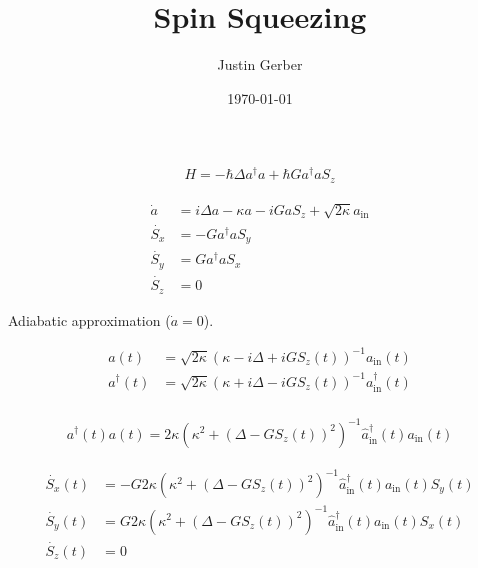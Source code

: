 \documentclass[12pt]{article}
\begin{document}
\title{Spin Squeezing}
\author{Justin Gerber}
\date{\today}
\maketitle

\begin{align}
H = -\hbar \Delta a^{\dag} a + \hbar G a^{\dag}a S_z
\end{align}

\begin{align}
\dot{a} &= i \Delta a -\kappa a - i G a S_z + \sqrt{2\kappa} a_{\text{in}}\\
\dot{S_x} &= - G a^{\dag} a S_y\\
\dot{S_y} &= G a^{\dag} a S_x\\
\dot{S_z} &= 0
\end{align}

Adiabatic approximation ($\dot{a} = 0$).

\begin{align}
a(t) &= \sqrt{2\kappa} \left(\kappa - i \Delta + i G S_z(t)\right)^{-1} a_{\text{in}}(t)\\
a^{\dag}(t) &= \sqrt{2\kappa} \left(\kappa + i \Delta - i G S_z(t)\right)^{-1} a^{\dag}_{\text{in}}(t)\\
\end{align}

\begin{align}
a^{\dag}(t) a(t) = 2\kappa \left( \kappa^2 + \left(\Delta - G S_z(t)\right)^2\right)^{-1} \hat{a}^{\dag}_{\text{in}}(t)a_{\text{in}}(t)
\end{align}

\begin{align}
\dot{S_x}(t) &= - G 2\kappa \left( \kappa^2 + (\Delta - G S_z(t))^2\right)^{-1} \hat{a}^{\dag}_{\text{in}}(t)a_{\text{in}}(t) S_y(t)\\
\dot{S_y}(t) &= G 2\kappa \left( \kappa^2 + (\Delta - G S_z(t))^2\right)^{-1} \hat{a}^{\dag}_{\text{in}}(t)a_{\text{in}}(t) S_x(t)\\
\dot{S_z}(t) &= 0
\end{align}
\end{document}
